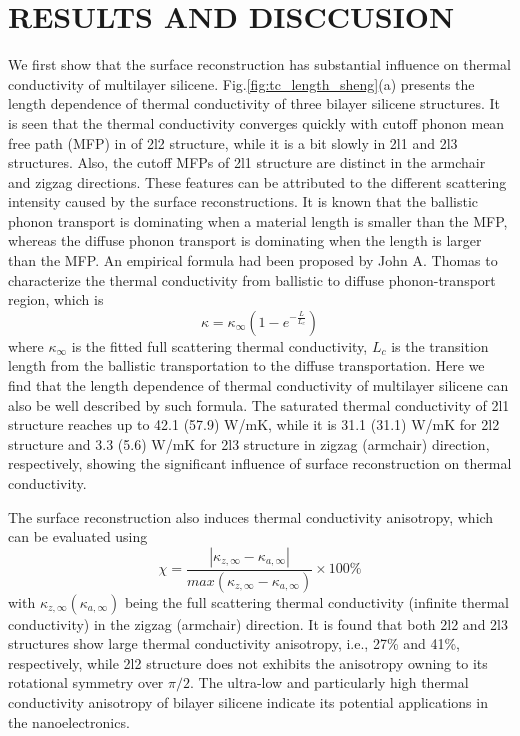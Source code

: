 \documentclass[aps,prb,twocolumn,showpacs,amsmath,amssymb]{revtex4-1}
\begin{document}
\section{RESULTS AND DISCCUSION}

We first show that the surface reconstruction has substantial influence on thermal conductivity of multilayer silicene.
Fig.\ref{fig:tc_length_sheng}(a) presents the length dependence of thermal conductivity of three bilayer silicene structures.
It is seen that the thermal conductivity converges quickly with cutoff phonon mean free path (MFP) in of 2l2 structure, while it is a bit slowly in 2l1 and 2l3 structures. Also, the cutoff MFPs of 2l1 structure are distinct in the armchair and zigzag directions. These features can be attributed to the different scattering intensity caused by the surface reconstructions.
It is known that the ballistic phonon transport is dominating when a material length is smaller than the MFP,  whereas the diffuse phonon transport is  dominating when the length is larger than the MFP.
An empirical formula had been proposed by John A. Thomas\cite{Thomas2010}  to characterize the thermal conductivity from ballistic to diffuse phonon-transport region, which is
\begin{equation}
  \kappa = \kappa_\infty (1-e^{-\frac{L}{L_c}}) \label{eq:eq_nemd}
\end{equation}
where $\kappa_\infty$ is the fitted full scattering thermal conductivity, $L_c$ is the transition length from the ballistic transportation to the diffuse transportation. Here we find that the length dependence of thermal conductivity of multilayer silicene can also be well described by such formula.
The saturated thermal conductivity of 2l1 structure reaches up to 42.1 (57.9) W/mK, while it is  31.1 (31.1) W/mK  for 2l2 structure and  3.3 (5.6)  W/mK for 2l3 structure in zigzag (armchair) direction, respectively,  showing the significant influence of surface reconstruction on thermal conductivity.

The surface reconstruction also induces thermal conductivity anisotropy, which can be evaluated using
\begin{equation}
  \chi=\frac{|\kappa_{z,\infty}-\kappa_{a,\infty} |}{ max⁡(\kappa_{z,\infty}-\kappa_{a,\infty} ) } \times 100 \%  \label{eq:eq_chi}
\end{equation}
with $ \kappa_{z,\infty} (\kappa_{a,\infty})$ being the full scattering thermal conductivity (infinite thermal conductivity) in the zigzag (armchair) direction.
It is found that both 2l2 and 2l3 structures show large thermal conductivity anisotropy, i.e., 27\% and 41\%, respectively, while 2l2 structure does not exhibits the anisotropy owning to its rotational symmetry over $\pi/2$.  The ultra-low and particularly high thermal conductivity anisotropy of bilayer silicene indicate its potential applications in the nanoelectronics.
\end{document}
